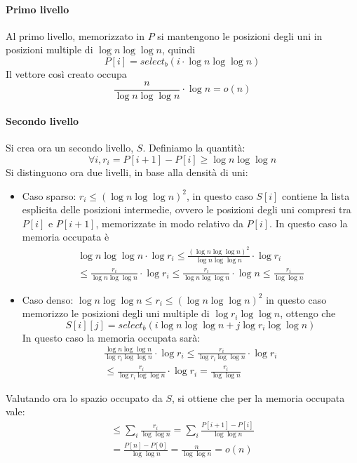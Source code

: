 \paragraph{Primo livello}
Al primo livello, memorizzato in $P$ si mantengono le posizioni degli uni in posizioni 
multiple di $\log n \log \log n$, quindi $$P[i] = \mathit{select}_b(i \cdot \log n \log \log n)$$
Il vettore così creato occupa 
$$\frac{n}{\log n \log \log n}\cdot \log n = o(n)$$

\paragraph{Secondo livello}
Si crea ora un secondo livello, $S$.
Definiamo la quantità:
$$\forall i, r_i = P[i+1] - P[i] \geq \log n \log \log n$$
Si distinguono ora due livelli, in base alla densità di uni:
\begin{itemize}
    \item Caso sparso: $r_i \leq (\log n\log \log n )^2$, in questo 
    caso $S[i]$ contiene la lista esplicita delle posizioni intermedie, 
    ovvero le posizioni degli uni compresi tra $P[i]$ e $P[i+1]$, memorizzate
    in modo relativo da $P[i]$. In questo caso la memoria occupata è 
    \begin{equation}
        \begin{aligned}
            \log n \log \log n \cdot \log r_i 
            \leq \frac{(\log n \log \log n)^2}{\log n \log \log n} \cdot \log r_i \\
            \leq \frac{r_i}{\log n \log \log n} \cdot \log r_i
            \leq \frac{r_i}{\log n \log \log n} \cdot \log n
            \leq \frac{r_i}{\log \log n}
        \end{aligned}
    \end{equation}
    \item Caso denso: $\log n\log \log n \leq r_i \leq (\log n\log \log n )^2$
    in questo caso memorizzo le posizioni degli uni multiple di 
    $\log r_i \log \log n$, ottengo che 
    $$S[i][j] = \mathit{select}_b (i \log n \log \log n + j \log r_i \log \log n)$$
    In questo caso la memoria occupata sarà:
    \begin{equation}
        \begin{aligned}
            \frac{\log n \log \log n}{\log r_i \log \log n} \cdot \log r_i 
            \leq \frac{r_i}{\log r_i \log \log n} \cdot \log r_i\\
            \leq \frac{r_i}{\log r_i \log \log n} \cdot \log r_i = \frac{r_i}{\log \log n}
        \end{aligned}
    \end{equation}  
\end{itemize}
Valutando ora lo spazio occupato da $S$, si ottiene che per la memoria occupata 
vale: 
\begin{equation}
    \begin{aligned}
        \leq \sum_i \frac{r_i}{\log \log n} = \sum_i \frac{P[i+1] - P[i]}{\log \log n}\\
        = \frac{P[n] - P[0]}{\log \log n} = \frac{n}{\log \log n} = o(n)
    \end{aligned}
\end{equation}

